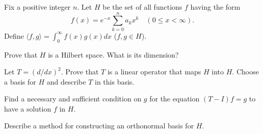 Fix a positive integer $n$. Let $H$ be the set of all functions $f$
having the form $$f(x)=e^{-x}\sum_{k=0}^na_kx^k \quad (0\leq
x<\infty).$$ Define $\langle f, g\rangle=\int_0^{\infty}f(x)g(x)dx$
($f,g\in H$).
\begin{alist}
\item Prove that $H$ is a Hilbert space. What is its dimension?
\item Let $T=(d/dx)^2$. Prove that $T$ is a linear operator that maps
$H$ into $H$. Choose a basis for $H$ and describe $T$ in this basis.
\item Find a necessary and sufficient condition on $g$ for the
equation $(T-I)f=g$ to have a solution $f$ in $H$.
\item Describe a method for constructing an orthonormal basis for $H$.
\end{alist}
